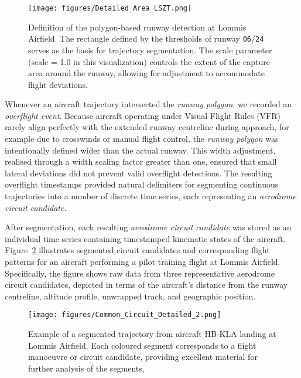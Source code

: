 \documentclass[
  manuscript=proceedings,  %
  layout=preprint,         %
  year=2025,
  volume=x,
]{extra/joas}
\begin{document}
\begin{figure}[ht!]
  \centering
  \vspace{-1.5em}
  \texttt{[image: figures/Detailed\_Area\_LSZT.png]}
  \caption{Definition of the polygon-based runway detection at Lommis Airfield. The rectangle defined by the thresholds of runway \texttt{06}/\texttt{24} serves as the basis for trajectory segmentation. The scale parameter (scale = 1.0 in this visualization) controls the extent of the capture area around the runway, allowing for adjustment to accommodate flight deviations.}
  \vspace{-0.5em}
  \label{fig:capture_runway_area}
\end{figure}

Whenever an aircraft trajectory intersected the \textit{runway polygon}, we recorded an \textit{overflight event}. Because aircraft operating under Visual Flight Rules (VFR) rarely align perfectly with the extended runway centreline during approach, for example due to crosswinds or manual flight control, the \textit{runway polygon} was intentionally defined wider than the actual runway. This width adjustment, realised through a width scaling factor greater than one, ensured that small lateral deviations did not prevent valid overflight detections. The resulting overflight timestamps provided natural delimiters for segmenting continuous trajectories into a number of discrete time series, each representing an \textit{aerodrome circuit candidate}.

After segmentation, each resulting \textit{aerodrome circuit candidate} was stored as an individual time series containing timestamped kinematic states of the aircraft. Figure~\ref{fig:lommis_circuits_detailed} illustrates segmented circuit candidates and corresponding flight patterns for an aircraft performing a pilot training flight at Lommis Airfield. Specifically, the figure shows raw data from three representative aerodrome circuit candidates, depicted in terms of the aircraft’s distance from the runway centreline, altitude profile, unwrapped track, and geographic position.

\begin{figure}[ht!]
  \centering
  \texttt{[image: figures/Common\_Circuit\_Detailed\_2.png]}
    \caption{Example of a segmented trajectory from aircraft HB-KLA landing at Lommis Airfield. Each coloured segment corresponds to a flight manoeuvre or circuit candidate, providing excellent material for further analysis of the segments.}
  \label{fig:lommis_circuits_detailed}
\end{figure}
\end{document}
